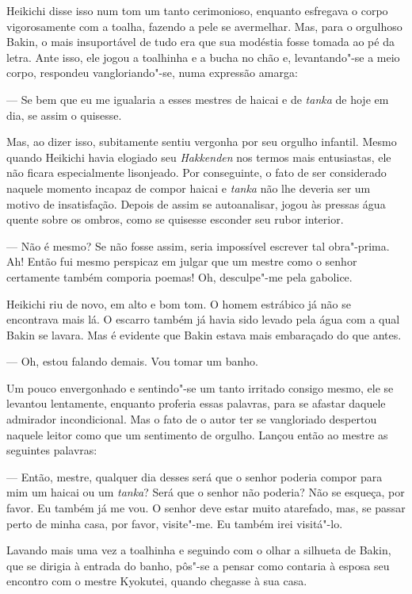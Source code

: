 Heikichi disse isso num tom um tanto cerimonioso, enquanto esfregava o
corpo vigorosamente com a toalha, fazendo a pele se avermelhar. Mas,
para o orgulhoso Bakin, o mais insuportável de tudo era que sua modéstia
fosse tomada ao pé da letra. Ante isso, ele jogou a toalhinha e a bucha
no chão e, levantando"-se a meio corpo, respondeu vangloriando"-se, 
numa expressão amarga:

--- Se bem que eu me igualaria a esses mestres de haicai e de
\textit{tanka} de hoje em dia, se assim o quisesse.

Mas, ao dizer isso, subitamente sentiu vergonha por seu orgulho
infantil. Mesmo quando Heikichi havia elogiado seu \textit{Hakkenden}
nos termos mais entusiastas, ele não ficara especialmente lisonjeado.
Por conseguinte, o fato de ser considerado naquele momento incapaz de
compor haicai e \textit{tanka} não lhe deveria ser um motivo de
insatisfação. Depois de assim se autoanalisar, jogou às pressas água
quente sobre os ombros, como se quisesse esconder seu rubor interior.

--- Não é mesmo? Se não fosse assim, seria impossível escrever tal
obra"-prima. Ah! Então fui mesmo perspicaz em julgar que um mestre
como o senhor certamente também comporia poemas! Oh, desculpe"-me pela gabolice.

Heikichi riu de novo, em alto e bom tom. O homem estrábico já não se
encontrava mais lá. O escarro também já havia sido levado pela água com
a qual Bakin se lavara. Mas é evidente que Bakin estava mais embaraçado
do que antes.

--- Oh, estou falando demais. Vou tomar um banho.

Um pouco envergonhado e sentindo"-se um tanto irritado consigo mesmo, ele
se levantou lentamente, enquanto proferia essas palavras, para se
afastar daquele admirador incondicional. Mas o fato de o autor ter se
vangloriado despertou naquele leitor como que um sentimento de orgulho.
Lançou então ao mestre as seguintes palavras:

--- Então, mestre, qualquer dia desses será que o senhor poderia compor
para mim um haicai ou um \textit{tanka}? Será que o senhor não poderia?
Não se esqueça, por favor. Eu também já me vou. O senhor deve estar
muito atarefado, mas, se passar perto de minha casa, por favor,
visite"-me. Eu também irei visitá"-lo.

Lavando mais uma vez a toalhinha e seguindo com o olhar a silhueta de
Bakin, que se dirigia à entrada do banho, pôs"-se a pensar como contaria
à esposa seu encontro com o mestre Kyokutei, quando chegasse à sua casa.

